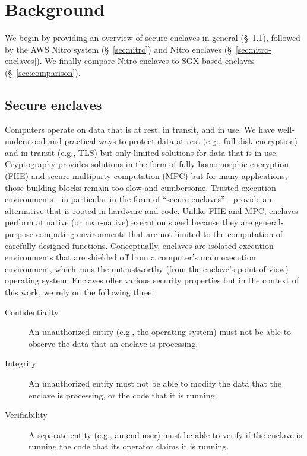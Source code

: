 \section{Background}%
\label{sec:background}

We begin by providing an overview of secure enclaves in general
(\S~\ref{sec:enclaves}), followed by the AWS Nitro system (\S~\ref{sec:nitro})
and Nitro enclaves (\S~\ref{sec:nitro-enclaves}).  We finally compare Nitro
enclaves to SGX-based enclaves (\S~\ref{sec:comparison}).

\subsection{Secure enclaves}%
\label{sec:enclaves}

Computers operate on data that is at rest, in transit, and in use.  We have
well-understood and practical ways to protect data at rest (e.g., full disk
encryption) and in transit (e.g., TLS) but only limited solutions for data that
is in use.  Cryptography provides solutions in the form of fully homomorphic
encryption (FHE) and secure multiparty computation (MPC) but for many
applications, those building blocks remain too slow and cumbersome.  Trusted
execution environments---in particular in the form of ``secure
enclaves''---provide an alternative that is rooted in hardware and code.  Unlike
FHE and MPC, enclaves perform at native (or near-native) execution speed because
they are general-purpose computing environments that are not limited to the
computation of carefully designed functions.  Conceptually, enclaves are
isolated execution environments that are shielded off from a computer's main
execution environment, which runs the untrustworthy (from the enclave's point of
view) operating system.  Enclaves offer various security properties but in the
context of this work, we rely on the following three:

\begin{description}
  \item[Confidentiality] An unauthorized entity (e.g., the operating system)
    must not be able to observe the data that an enclave is processing.

  \item[Integrity] An unauthorized entity must not be able to modify the data
    that the enclave is processing, or the code that it is running.

  \item[Verifiability] A separate entity (e.g., an end user) must be able to
    verify if the enclave is running the code that its operator claims it is
    running.
\end{description}

